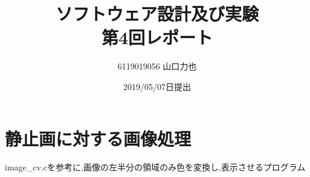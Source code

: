 \documentclass{jarticle}
\title{ソフトウェア設計及び実験\\
第4回レポート}
\author{6119019056 山口力也}
\date{2019/05/07日提出}
\begin{document}
\maketitle
\section{静止画に対する画像処理}
image_cv.cを参考に,画像の左半分の領域のみ色を変換し,表示させるプログラム
\end{document}

